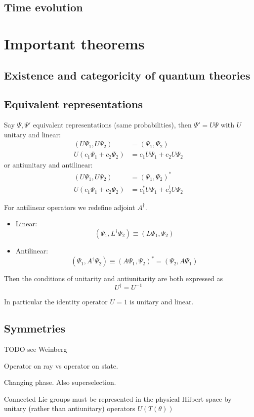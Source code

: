 \subsection{Time evolution}

\section{Important theorems}
\subsection{Existence and categoricity of quantum theories}

\subsection{Equivalent representations}
Say $\Psi, \Psi'$ equivalent representations (same probabilities), then $\Psi'= U\Psi$ with $U$ unitary and linear:
\begin{align*}
(U\Psi_1, U\Psi_2) &= (\Psi_1, \Psi_2) \\
U(c_1\Psi_1 + c_2 \Psi_2) &= c_1U\Psi_1 + c_2U\Psi_2
\end{align*}
or antiunitary and antilinear:
\begin{align*}
(U\Psi_1, U\Psi_2) &= (\Psi_1, \Psi_2)^* \\
U(c_1\Psi_1 + c_2 \Psi_2) &= c_1^*U\Psi_1 + c_2^(U\Psi_2
\end{align*}

For antilinear operators we redefine adjoint $A^\dagger$.
\begin{itemize}
\item Linear:
\[ (\Psi_1, L^\dagger \Psi_2) \equiv (L\Psi_1, \Psi_2) \]
\item Antilinear:
\[ (\Psi_1, A^\dagger \Psi_2) \equiv (A\Psi_1, \Psi_2)^* = (\Psi_2, A\Psi_1) \]
\end{itemize}
Then the conditions of unitarity and antiunitarity are both expressed as
\[ U^\dagger = U^{-1} \]

In particular the identity operator $U = 1$ is unitary and linear.
\subsection{Symmetries}
TODO see Weinberg

Operator on ray vs operator on state.

Changing phase. Also superselection.

Connected Lie groups must be represented in the physical Hilbert space by unitary (rather than antiunitary) operators $U(T(\theta))$

